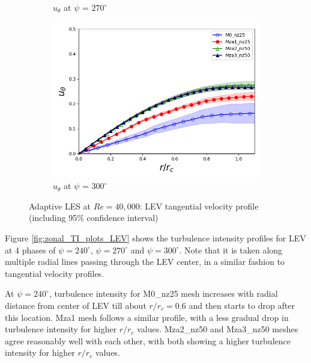 \begin{figure}[H]
\begin{subfigure}[b]{0.475\textwidth}
	\caption{ $u_\theta$ at $\psi$ = $270^\circ$}
	\label{fig:zonal_utheta_270}
    \end{subfigure}
	\begin{subfigure}[b]{0.475\textwidth}
	\centering
	\includegraphics[width=1\textwidth]{figures/zonal_adapt_results/LEV/u_theta/phase_300.png}
	\caption{ $u_\theta$ at $\psi$ = $300^\circ$}
	\label{fig:zonal_utheta_300}
	\end{subfigure}
   	\caption{Adaptive LES at $Re=40,000$: LEV tangential velocity profile (including 95\% confidence interval)}
   	\label{fig:zonal_utheta_LEV}
\end{figure}



Figure \ref{fig:zonal_TI_plots_LEV} shows the turbulence intensity profiles for LEV at 4 phases of $\psi = 240^\circ$, $\psi = 270^\circ$ and $\psi = 300^\circ$. 
Note that it is taken along multiple radial lines passing through the LEV center, in a similar fashion to tangential velocity profiles.

At $\psi = 240^\circ$, turbulence intensity for M0\_nz25 mesh increases with radial distance from center of LEV till about $r/r_c = 0.6$ and then starts to drop after this location.
Mza1 mesh follows a similar profile, with a less gradual drop in turbulence intensity for higher $r/r_c $ values.
Mza2\_nz50 and Mza3\_nz50 meshes agree reasonably well with each other, with both showing a higher turbulence intensity for higher $r/r_c$ values.


